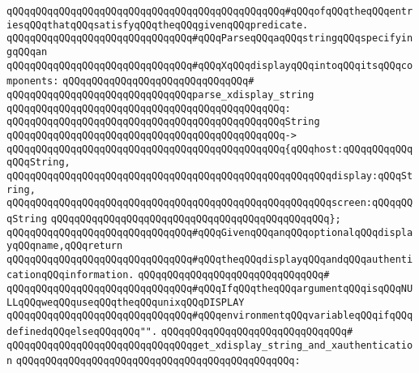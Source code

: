 \verb|qQQqqQQqqQQqqQQqqQQqqQQqqQQqqQQqqQQqqQQqqQQqqQQq#qQQqofqQQqtheqQQqentriesqQQqthatqQQqsatisfyqQQqtheqQQqgivenqQQqpredicate.|\newline
\newline
\newline
\verb|qQQqqQQqqQQqqQQqqQQqqQQqqQQqqQQq#qQQqParseqQQqaqQQqstringqQQqspecifyingqQQqan|\newline
\verb|qQQqqQQqqQQqqQQqqQQqqQQqqQQqqQQq#qQQqXqQQqdisplayqQQqintoqQQqitsqQQqcomponents:|\newline
\verb|qQQqqQQqqQQqqQQqqQQqqQQqqQQqqQQq#|\newline
\verb|qQQqqQQqqQQqqQQqqQQqqQQqqQQqqQQqparse_xdisplay_string|\newline
\verb|qQQqqQQqqQQqqQQqqQQqqQQqqQQqqQQqqQQqqQQqqQQqqQQq:|\newline
\verb|qQQqqQQqqQQqqQQqqQQqqQQqqQQqqQQqqQQqqQQqqQQqqQQqString|\newline
\verb|qQQqqQQqqQQqqQQqqQQqqQQqqQQqqQQqqQQqqQQqqQQqqQQq->|\newline
\verb|qQQqqQQqqQQqqQQqqQQqqQQqqQQqqQQqqQQqqQQqqQQqqQQq{qQQqhost:qQQqqQQqqQQqqQQqString,|\newline
\verb|qQQqqQQqqQQqqQQqqQQqqQQqqQQqqQQqqQQqqQQqqQQqqQQqqQQqqQQqdisplay:qQQqString,|\newline
\verb|qQQqqQQqqQQqqQQqqQQqqQQqqQQqqQQqqQQqqQQqqQQqqQQqqQQqqQQqscreen:qQQqqQQqString|\newline
\verb|qQQqqQQqqQQqqQQqqQQqqQQqqQQqqQQqqQQqqQQqqQQqqQQq};|\newline
\newline
\verb|qQQqqQQqqQQqqQQqqQQqqQQqqQQqqQQq#qQQqGivenqQQqanqQQqoptionalqQQqdisplayqQQqname,qQQqreturn|\newline
\verb|qQQqqQQqqQQqqQQqqQQqqQQqqQQqqQQq#qQQqtheqQQqdisplayqQQqandqQQqauthenticationqQQqinformation.|\newline
\verb|qQQqqQQqqQQqqQQqqQQqqQQqqQQqqQQq#|\newline
\verb|qQQqqQQqqQQqqQQqqQQqqQQqqQQqqQQq#qQQqIfqQQqtheqQQqargumentqQQqisqQQqNULLqQQqweqQQquseqQQqtheqQQqunixqQQqDISPLAY|\newline
\verb|qQQqqQQqqQQqqQQqqQQqqQQqqQQqqQQq#qQQqenvironmentqQQqvariableqQQqifqQQqdefinedqQQqelseqQQqqQQq"".|\newline
\verb|qQQqqQQqqQQqqQQqqQQqqQQqqQQqqQQq#|\newline
\verb|qQQqqQQqqQQqqQQqqQQqqQQqqQQqqQQqget_xdisplay_string_and_xauthentication|\newline
\verb|qQQqqQQqqQQqqQQqqQQqqQQqqQQqqQQqqQQqqQQqqQQqqQQq:|\newline
